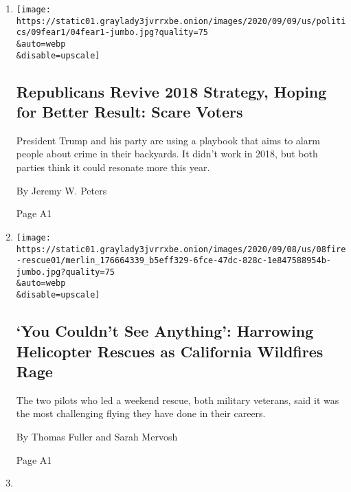 \begin{enumerate}
\def\labelenumi{\arabic{enumi}.}
\item
  \href{/2020/09/08/us/politics/trump-republicans-fear-strategy.html}{}

  \texttt{[image: https://static01.graylady3jvrrxbe.onion/images/2020/09/09/us/politics/09fear1/04fear1-jumbo.jpg?quality=75\\\&auto=webp\\\&disable=upscale]}

  \hypertarget{republicans-revive-2018-strategy-hoping-for-better-result-scare-voters}{%
  \subsection{Republicans Revive 2018 Strategy, Hoping for Better
  Result: Scare
  Voters}\label{republicans-revive-2018-strategy-hoping-for-better-result-scare-voters}}

  President Trump and his party are using a playbook that aims to alarm
  people about crime in their backyards. It didn't work in 2018, but
  both parties think it could resonate more this year.

  By Jeremy W. Peters

  Page A1
\item
  \href{/2020/09/08/us/california-wildfires-helicopter-rescue.html}{}

  \texttt{[image: https://static01.graylady3jvrrxbe.onion/images/2020/09/08/us/08fire-rescue01/merlin\_176664339\_b5eff329-6fce-47dc-828c-1e847588954b-jumbo.jpg?quality=75\\\&auto=webp\\\&disable=upscale]}

  \hypertarget{you-couldnt-see-anything-harrowing-helicopter-rescues-as-california-wildfires-rage}{%
  \subsection{`You Couldn't See Anything': Harrowing Helicopter Rescues
  as California Wildfires
  Rage}\label{you-couldnt-see-anything-harrowing-helicopter-rescues-as-california-wildfires-rage}}

  The two pilots who led a weekend rescue, both military veterans, said
  it was the most challenging flying they have done in their careers.

  By Thomas Fuller and Sarah Mervosh

  Page A1
\item
  \href{/2020/09/08/health/coronavirus-astrazeneca-vaccine-safety.html}{}

  \hypertarget{astrazeneca-pauses-vaccine-trial-for-safety-review}{%
}
\end{enumerate}
